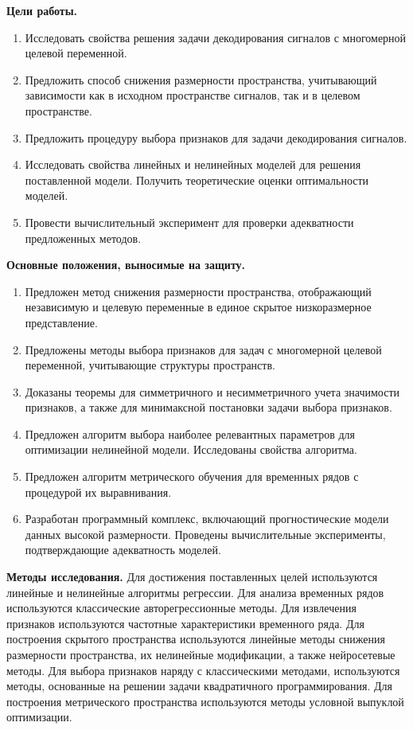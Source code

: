 \vspace{0.5cm}
\textbf{Цели работы.}
\begin{enumerate}
	\item Исследовать свойства решения задачи декодирования сигналов с многомерной целевой переменной.
	\item Предложить способ снижения размерности пространства, учитывающий зависимости как в исходном пространстве сигналов, так и в целевом пространстве.
	\item Предложить процедуру выбора признаков для задачи декодирования сигналов.
	\item Исследовать свойства линейных и нелинейных моделей для решения поставленной модели. Получить теоретические оценки оптимальности моделей.
	\item Провести вычислительный эксперимент для проверки адекватности предложенных методов.
\end{enumerate}


\vspace{0.5cm}
\textbf{Основные положения, выносимые на защиту.}
\begin{enumerate}
	\item Предложен метод снижения размерности пространства, отображающий независимую и целевую переменные в единое скрытое низкоразмерное представление.
	\item Предложены методы выбора признаков для задач с многомерной целевой переменной, учитывающие структуры пространств.
	\item Доказаны теоремы для симметричного и несимметричного учета значимости признаков, а также для минимаксной постановки задачи выбора признаков.
	\item Предложен алгоритм выбора наиболее релевантных параметров для оптимизации нелинейной модели. Исследованы свойства алгоритма.
	\item Предложен алгоритм метрического обучения для временных рядов с процедурой их выравнивания.
	\item Разработан программный комплекс, включающий прогностические модели данных высокой размерности. Проведены вычислительные эксперименты, подтверждающие адекватность моделей.
\end{enumerate}

\vspace{0.5cm}
\textbf{Методы исследования.}
Для достижения поставленных целей используются линейные и нелинейные алгоритмы регрессии.
Для анализа временных рядов используются классические авторегрессионные методы.
Для извлечения признаков используются частотные характеристики временного ряда.
Для построения скрытого пространства используются линейные методы снижения размерности пространства, их нелинейные модификации, а также нейросетевые методы.
Для выбора признаков наряду с классическими методами, используются методы, основанные на решении задачи квадратичного программирования.
Для построения метрического пространства используются методы условной выпуклой оптимизации.


